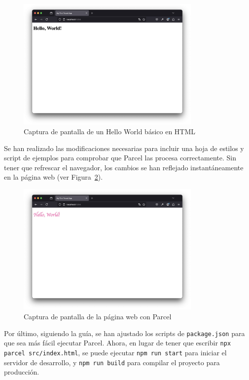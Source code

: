 \documentclass{article}
\begin{document}
 \begin{figure}[h!]
     \centering
     \includegraphics[width=0.8\textwidth]{./img/hello-world}
     \caption{Captura de pantalla de un Hello World básico en HTML}
     \label{fig:hello-world}
 \end{figure}

Se han realizado las modificaciones necesarias para incluir una hoja de estilos y script de ejemplos para comprobar que Parcel las procesa correctamente.
Sin tener que refrescar el navegador, los cambios se han reflejado instantáneamente en la página web (ver Figura~\ref{fig:parcel}).

 \begin{figure}[h!]
     \centering
     \includegraphics[width=0.8\textwidth]{./img/hello-world-styled}
     \caption{Captura de pantalla de la página web con Parcel}
     \label{fig:parcel}
 \end{figure}

Por último, siguiendo la guía, se han ajustado los scripts de \lstinline|package.json| para que sea más fácil ejecutar Parcel.
Ahora, en lugar de tener que escribir \lstinline|npx parcel src/index.html|, se puede ejecutar \lstinline|npm run start| para iniciar el servidor de desarrollo, y \lstinline|npm run build| para compilar el proyecto para producción.
\end{document}
